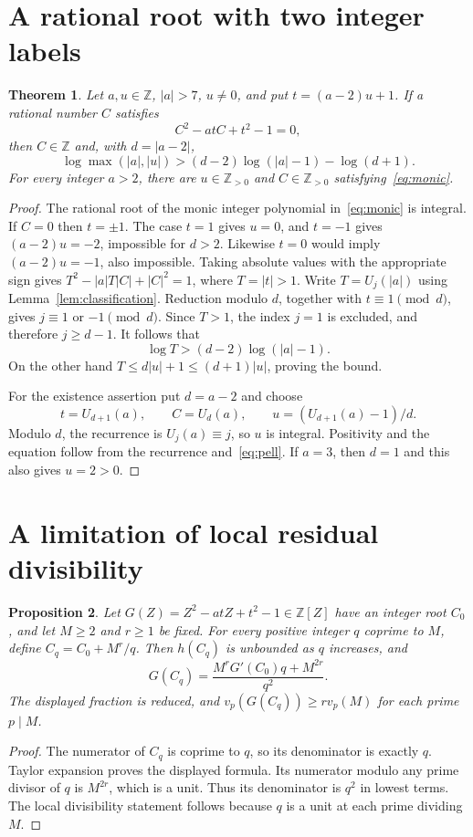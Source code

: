 \documentclass[11pt,a4paper]{article}
\newtheorem{theorem}{Theorem}[section]
\newtheorem{proposition}[theorem]{Proposition}
\newcommand{\Z}{\mathbb Z}\newcommand{\Q}{\mathbb Q}
\begin{document}
\section{A rational root with two integer labels}

\begin{theorem}\label{thm:monic}
Let $a,u\in\Z$, $|a|>7$, $u\ne0$, and put $t=(a-2)u+1$.
If a rational number $C$ satisfies
\begin{equation}\label{eq:monic}
                         C^2-atC+t^2-1=0,
\end{equation}
then $C\in\Z$ and, with $d=|a-2|$,
\[
 \log\max(|a|,|u|)>
              (d-2)\log(|a|-1)-\log(d+1).
\]
For every integer $a>2$, there are $u\in\Z_{>0}$ and
$C\in\Z_{>0}$ satisfying~\eqref{eq:monic}.
\end{theorem}
\begin{proof}
The rational root of the monic integer polynomial in~\eqref{eq:monic}
is integral. If $C=0$ then $t=\pm1$. The case $t=1$ gives $u=0$,
and $t=-1$ gives $(a-2)u=-2$, impossible for $d>2$.
Likewise $t=0$ would imply $(a-2)u=-1$, also impossible.
Taking absolute values with the appropriate sign gives
$T^2-|a|T|C|+|C|^2=1$, where $T=|t|>1$.
Write $T=U_j(|a|)$ using Lemma~\ref{lem:classification}.
Reduction modulo $d$, together with $t\equiv1\pmod d$, gives
$j\equiv1$ or $-1\pmod d$. Since $T>1$, the index $j=1$ is
excluded, and therefore $j\ge d-1$.
It follows that
\[
 \log T>(d-2)\log(|a|-1).
\]
On the other hand $T\le d|u|+1\le(d+1)|u|$, proving the bound.

For the existence assertion put $d=a-2$ and choose
\[
 t=U_{d+1}(a),\qquad C=U_d(a),\qquad
 u=(U_{d+1}(a)-1)/d.
\]
Modulo $d$, the recurrence is $U_j(a)\equiv j$, so $u$ is
integral. Positivity and the equation follow from the recurrence
and~\eqref{eq:pell}. If $a=3$, then $d=1$ and this also gives
$u=2>0$.
\end{proof}

\section{A limitation of local residual divisibility}

\begin{proposition}\label{prop:perturbation}
Let $G(Z)=Z^2-a t Z+t^2-1\in\Z[Z]$ have an integer root $C_0$,
and let $M\ge2$ and $r\ge1$ be fixed. For every positive integer
$q$ coprime to $M$, define $C_q=C_0+M^r/q$. Then $h(C_q)$ is
unbounded as $q$ increases, and
\[
 G(C_q)=\frac{M^rG'(C_0)q+M^{2r}}{q^2}.
\]
The displayed fraction is reduced, and
$v_p(G(C_q))\ge r v_p(M)$ for each prime $p\mid M$.
\end{proposition}
\begin{proof}
The numerator of $C_q$ is coprime to $q$, so its denominator is
exactly $q$. Taylor expansion proves the displayed formula.
Its numerator modulo any prime divisor of $q$ is $M^{2r}$,
which is a unit. Thus its denominator is $q^2$ in lowest terms.
The local divisibility statement follows because $q$ is a unit
at each prime dividing $M$.
\end{proof}
\end{document}
